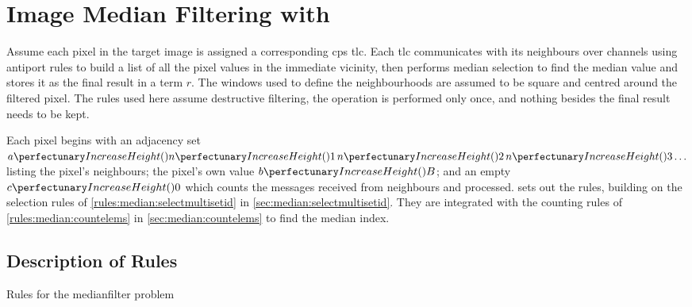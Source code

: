 \section{Image Median Filtering with }\label{sec:median:cpsmedianfilter}

Assume each pixel in the target image is assigned a corresponding \gls{cps} \gls{tlc}.  Each \gls{tlc} communicates with its neighbours over channels using antiport rules to build a list of all the pixel values in the immediate vicinity, then performs median selection to find the median value and stores it as the final result in a term \(r\).  The windows used to define the neighbourhoods are assumed to be square and centred around the filtered pixel. The rules used here assume destructive filtering, \ie{} the operation is performed only once, and nothing besides the final result needs to be kept.

Each pixel begins with an adjacency set \(\cpfunc{a}{\cpfunc{n}{1} \, \cpfunc{n}{2} \, \cpfunc{n}{3} \ldots}\) listing the pixel's neighbours; the pixel's own value \(\cpfunc{b}{B}\); and an empty \(\cpfunc{c}{0}\) which counts the messages received from neighbours and processed.   sets out the rules, building on the selection rules of \vref{rules:median:selectmultisetid} in \cref{sec:median:selectmultisetid}.  They are integrated with the counting rules of \vref{rules:median:countelems} in \cref{sec:median:countelems} to find the median index.

\subsection{Description of Rules}

\begin{cprulesetfloat}
\begin{cpruleset}
%
%
%
%

%
\end{cpruleset}
\caption{\label{ruleset:medianfilter}Rules for the \gls{medianfilter} problem}
\end{cprulesetfloat}

